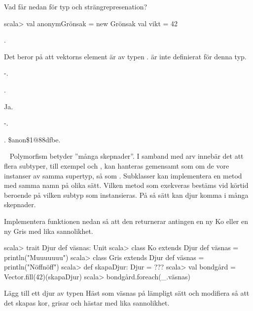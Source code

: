 Vad får  nedan för typ och strängrepresenation?
\begin{REPL}
scala> val anonymGrönsak = new Grönsak { val vikt = 42 }
\end{REPL}



\SOLUTION


\TaskSolved \what


\SubtaskSolved  {}.

\SubtaskSolved  Det beror på att vektorns element är av typen .  är inte definierat för denna typ.

\SubtaskSolved  -.

\SubtaskSolved  {}.

\SubtaskSolved  Ja.

\SubtaskSolved  -.

\SubtaskSolved  {}. \$anon\$1@88dfbe.


\QUESTEND







\QUESTBEGIN

\Task  \what~  Polymorfism betyder ''många skepnader''. I samband med arv  innebär det att flera subtyper, till exempel  och , kan hanteras gemensamt som om de vore instanser av samma supertyp, så som . Subklasser kan implementera en metod med samma namn på olika sätt. Vilken metod som exekveras bestäms vid körtid beroende på vilken subtyp som instansieras. På så sätt kan djur komma i många skepnader.

\Subtask Implementera funktionen  nedan så att den returnerar antingen en ny Ko eller en ny Gris med lika sannolikhet.

\begin{REPL}
scala> trait Djur { def väsnas: Unit }
scala> class Ko   extends Djur { def väsnas = println("Muuuuuuu") }
scala> class Gris extends Djur { def väsnas = println("Nöffnöff") }
scala> def skapaDjur: Djur = ???
scala> val bondgård = Vector.fill(42)(skapaDjur)
scala> bondgård.foreach(_.väsnas)
\end{REPL}

\Subtask Lägg till ett djur av typen Häst som väsnas på lämpligt sätt och modifiera  så att det skapas kor, grisar och hästar med lika sannolikhet.



